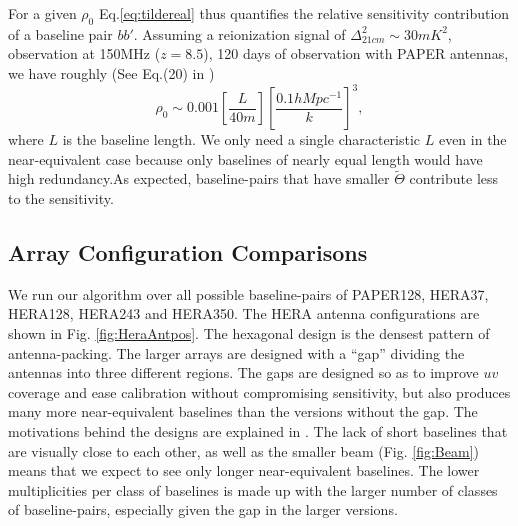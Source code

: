 \documentclass[twocolumn,apj,numberedappendix]{emulateapj}
\renewcommand\[{\begin{equation}}
\renewcommand\]{\end{equation}}
\begin{document}
For a given $\rho_0$ Eq.\ref{eq:tildereal} thus quantifies the relative sensitivity contribution of a baseline pair $bb'$. Assuming a reionization signal of $\Delta_{21cm}^2\sim 30mK^2$, observation at 150MHz ($z=8.5$), 120 days of observation with PAPER antennas, we have roughly
(See Eq.(20) in \cite{first-paper})
\begin{equation}
\rho_0 \sim 0.001\left[\frac{L}{40m}\right] \left[\frac{0.1hMpc^{-1}}{k}\right]^3, 
\end{equation}
where $L$ is the baseline length. We only need a single characteristic $L$ even in the near-equivalent case because only baselines of nearly equal length would have high redundancy.As expected, baseline-pairs that have smaller $\widetilde{\Theta}$ contribute less to the sensitivity. 

\subsection{Array Configuration Comparisons \label{sec:arrconf}}
We run our algorithm over all possible baseline-pairs of  PAPER128, HERA37, HERA128, HERA243 and HERA350. The HERA antenna configurations are shown in Fig. \ref{fig:HeraAntpos}. The  
hexagonal design is the densest pattern of antenna-packing. The larger arrays are designed with a ``gap'' dividing the antennas into three different regions. The gaps are designed so as to improve $uv$ coverage and ease calibration without compromising sensitivity, but also produces many more near-equivalent baselines than the versions without the gap. The motivations behind the designs are explained in \cite{HERAconfiguration}.  The lack of short baselines that are visually close to each other, as well as the smaller beam (Fig. \ref{fig:Beam}) means that we expect to see only longer near-equivalent baselines. The lower multiplicities per class of baselines is made up with the larger number of classes of baseline-pairs, especially given the gap in the larger versions. 
\end{document}
